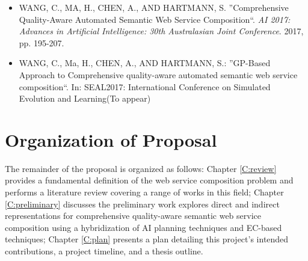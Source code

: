 \begin{itemize}
 \item WANG, C., MA, H., CHEN, A., AND HARTMANN, S. ''Comprehensive Quality-Aware Automated Semantic Web Service Composition``. \textit{AI 2017: Advances in Artificial Intelligence: 30th Australasian Joint Conference}. 2017, pp. 195-207.
 \item WANG, C., Ma, H., CHEN, A., AND HARTMANN, S.: ''GP-Based Approach to Comprehensive quality-aware automated semantic web service composition``. In: SEAL2017: International Conference on Simulated Evolution and Learning(To appear)
\end{itemize}


\section{Organization of Proposal}The remainder of the proposal is organized as follows: Chapter \ref{C:review} provides a fundamental definition of the web service composition problem and performs a literature review covering a range of works in this field; Chapter \ref{C:preliminary} discusses the preliminary work explores direct and indirect representations for comprehensive quality-aware semantic web service composition using a hybridization of AI planning techniques and EC-based techniques; Chapter \ref{C:plan} presents a plan detailing this project's intended contributions, a project timeline, and a thesis outline.
